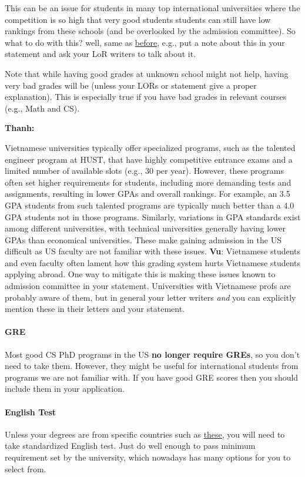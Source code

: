 \documentclass[oneside,11pt]{memoir}
\newenvironment{commentbox}[1][]{
\small
    \begin{mybox}
    {\small \textbf{#1}}
 }{
   \end{mybox}
}
\newcommand{\red}[1]{{\color{red}{#1}}}
\begin{document}
This can be an issue for students in many top international universities where the competition is so high that very good students students can still have low rankings from these schools (and be overlooked by the admission committee).
So what to do with this? well, same as \hyperref[sec:your-school]{before}, e.g., put a note about this in your statement and ask your LoR writers to talk about it.

Note that while having good grades at unknown school might not help,
having very bad grades will be \red{red flag} (unless your LORs or
statement give a proper explanation). This is especially true if you
have bad grades in relevant courses (e.g., Math and CS).

\begin{commentbox}[Thanh:]
Vietnamese universities typically offer specialized programs, such as the talented engineer program at HUST, that have highly competitive entrance exams and a limited number of available slots (e.g., 30 per year). However, these programs often set higher requirements for students, including more demanding tests and assignments, resulting in lower GPAs and overall rankings. For example, an 3.5 GPA students from such talented programs are typically much better than a 4.0 GPA students not in those programs.  Similarly, variations in GPA standards exist among different universities, with technical universities generally having lower GPAs than economical universities. These make gaining admission in the US difficult as US faculty are not familiar with these issues.
\tcblower
\textbf{Vu}: Vietnamese students and even faculty often lament how this grading system hurts Vietnamese students applying abroad. One way to mitigate this is making these issues known to admission committee in your statement.  Universities with Vietnamese profs are probably aware of them, but in general your letter writers \emph{and} you can explicitly mention these in their letters and your statement.
\end{commentbox}

\paragraph{GRE} Most good CS PhD programs in the US \textbf{no longer require GREs}, so you don't need to take them. However, they might be useful for international students from programs we are not familiar with.  If you have good GRE scores then you should include them in your application.

\paragraph{English Test} Unless your degrees are from specific countries such as \href{https://github.com/dynaroars/dynaroars.github.io/wiki/About-GMU#standard-tests-waiver-eligible-countries}{these}, you will need to
take standardized English test. Just do well enough to pass minimum requirement set by the university, which nowadays has many options for you to select from.
\end{document}
